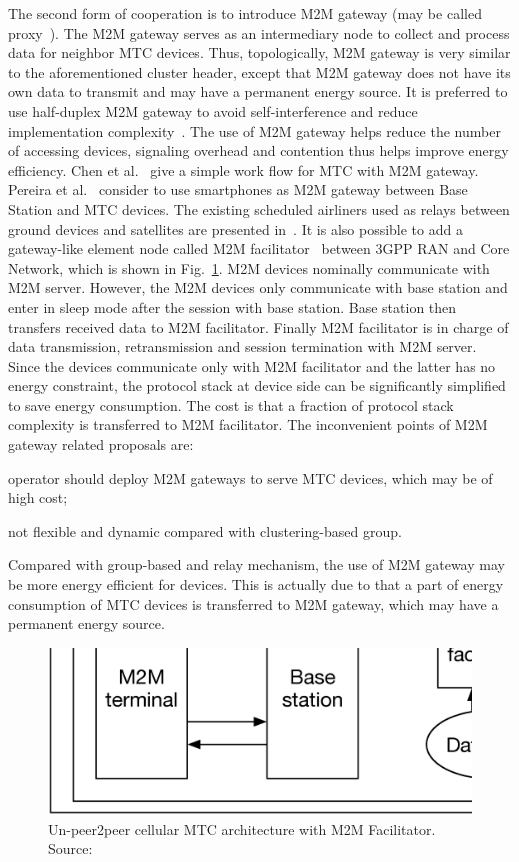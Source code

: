 The second form of cooperation is to introduce M2M gateway (may be called proxy~\cite{ChenY10machine}). The M2M gateway serves as an intermediary node to collect and process data for neighbor MTC devices. Thus, topologically, M2M gateway is very similar to the aforementioned cluster header, except that M2M gateway does not have its own data to transmit and may have a permanent energy source. 
It is preferred to use half-duplex M2M gateway to avoid self-interference and reduce implementation complexity~\cite{KanZheng12}.
The use of M2M gateway helps reduce the number of accessing devices, signaling overhead and contention thus helps improve energy efficiency. Chen et al.~\cite{ChenY10machine} give a simple work flow for MTC with M2M gateway. Pereira et al.~\cite{pereira2014towards} consider to use smartphones as M2M gateway between Base Station and MTC devices. The existing scheduled airliners used as relays between ground devices and satellites are presented in~\cite{plass2012concept}. It is also possible to add a gateway-like element node called M2M facilitator~\cite{ChenY09} between 3GPP RAN and Core Network, which is shown in Fig.~\ref{fig:M2M Facilitator}. 
M2M devices nominally communicate with M2M server. However, the M2M devices only communicate with base station and enter in sleep mode after the session with base station. Base station then transfers received data to M2M facilitator. Finally M2M facilitator is in charge of data transmission, retransmission and session termination with M2M server. Since the devices communicate only with M2M facilitator and the latter has no energy constraint, the protocol stack at device side can be significantly simplified to save energy consumption. The cost is that a fraction of protocol stack complexity is transferred to M2M facilitator. The inconvenient points of M2M gateway related proposals are:\begin{inparaenum}[(i)]
	\item operator should deploy M2M gateways to serve MTC devices, which may be of high cost;
	\item not flexible and dynamic compared with clustering-based group.
\end{inparaenum}
Compared with group-based and relay mechanism, the use of M2M gateway may be more energy efficient for devices. This is actually due to that a part of energy consumption of MTC devices is transferred to M2M gateway, which may have a permanent energy source.
\begin{figure}[!t]
	\centering
	\includegraphics[width=0.9\linewidth]{Chapter2/Figures/M2M_Facilitator}
	\caption{Un-peer2peer cellular MTC architecture with M2M Facilitator. Source:~\cite{ChenY09} }
	\label{fig:M2M Facilitator}
\end{figure}

